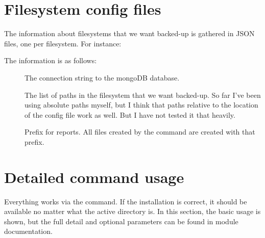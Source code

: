\documentclass[letterpaper,10pt,english]{sphinxmanual}
\begin{document}
\chapter{Filesystem config files}
\label{\detokenize{index:filesystem-config-files}}
The information about filesystems that we want backed-up is gathered in JSON files,
one per filesystem. For instance:

\begin{sphinxVerbatim}[commandchars=\\\{\}]
   
   \PYG{p}{[}
  \PYG{p}{]}
   
\end{sphinxVerbatim}

The information is as follows:
\begin{description}
\item[{}] \leavevmode
The connection string to the mongoDB database.

\item[{}] \leavevmode
The list of paths in the filesystem that we want backed-up. So far I've been using absolute paths myself,
but I think that paths relative to the location of the config file work as well. But I have not tested
it that heavily.

\item[{}] \leavevmode
Prefix for reports. All files created by the  command are created with that prefix.

\end{description}


\chapter{Detailed command usage}
\label{\detokenize{index:detailed-command-usage}}
Everything works via the  command. If the installation is correct, it should be available no matter what the active directory is.
In this section, the basic usage is shown, but the full detail and optional parameters can be found in {\hyperref[\detokenize{index:module-fsbackup.commands}]{}} module documentation.
\end{document}
